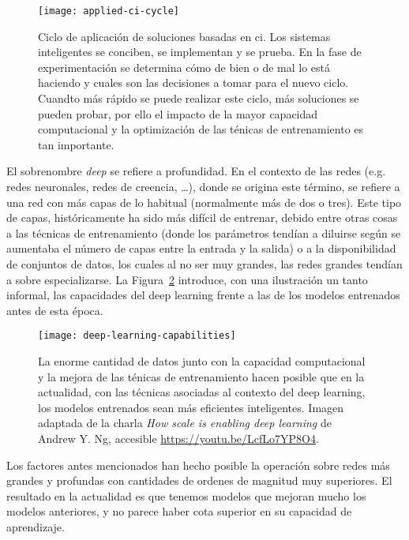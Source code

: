 \begin{figure}[t]
	\centering
	\texttt{[image: applied-ci-cycle]}
	\caption[Ciclo de aplicación de soluciones basadas en \acrlong{ci}]{Ciclo de aplicación de soluciones basadas en \acrlong{ci}. Los sistemas inteligentes se conciben, se implementan y se prueba. En la fase de experimentación se determina cómo de bien o de mal lo está haciendo y cuales son las decisiones a tomar para el nuevo ciclo. Cuandto más rápido se puede realizar este ciclo, más soluciones se pueden probar, por ello el impacto de la mayor capacidad computacional y la optimización de las ténicas de entrenamiento es tan importante.}
	\label{fig:applied-ci-cycle}
\end{figure}

El sobrenombre \textit{deep} se refiere a profundidad. En el contexto de las redes (e.g. redes neuronales, redes de creencia, \ldots), donde se origina este término, se refiere a una red con más capas de lo habitual (normalmente más de dos o tres). Este tipo de capas, históricamente ha sido más difícil de entrenar, debido entre otras cosas a las técnicas de entrenamiento (donde los parámetros tendían a diluirse según se aumentaba el número de capas entre la entrada y la salida) o a la disponibilidad de conjuntos de datos, los cuales al no ser muy grandes, las redes grandes tendían a sobre especializarse. La Figura~\ref{fig:deep-learning-capabilities} introduce, con una ilustración un tanto informal, las capacidades del deep learning frente a las de los modelos entrenados antes de esta época.

\begin{figure}
	\texttt{[image: deep-learning-capabilities]}
	\caption[Capacidad de los modelos en función de la cantidad de datos]{La enorme cantidad de datos junto con la capacidad computacional y la mejora de las ténicas de entrenamiento hacen posible que en la actualidad, con las técnicas asociadas al contexto del deep learning, los modelos entrenados sean más eficientes  inteligentes. Imagen adaptada de la charla \textit{How scale is enabling deep learning} de Andrew Y. Ng, accesible \url{https://youtu.be/LcfLo7YP8O4}.}
	\label{fig:deep-learning-capabilities}
\end{figure}

Los factores antes mencionados han hecho posible la operación sobre redes más grandes y profundas con cantidades de ordenes de magnitud muy superiores. El resultado en la actualidad es que tenemos modelos que mejoran mucho los modelos anteriores, y no parece haber cota superior en su capacidad de aprendizaje.


